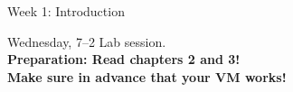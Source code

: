 \documentclass{beamer}
\begin{document}
\begin{frame}{Week 1: Introduction}

\begin{block}{Wednesday, 7--2}
Lab session.\\
\textbf{Preparation: Read chapters 2 and 3! \\Make sure in advance that your VM works!}

\end{block}


\end{frame}
%
%
%
%
%
%	
%	
%
%
\end{document}
